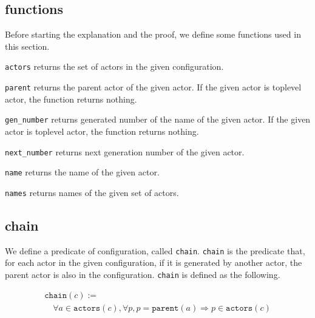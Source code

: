 \subsection{functions}

Before starting the explanation and the proof, we define some functions used in this section.

\begin{description}[style=nextline,leftmargin=12pt,parsep=0pt]
\item[\texttt{actors} $: \textit{Configuration} \rightarrow \textit{Set(Actor)}$]
  \texttt{actors} returns the set of actors in the given configuration.
\item[\texttt{parent} $: \textit{Actor} \rightarrow \textit{Actor}$]
  \texttt{parent} returns the parent actor of the given actor.
  If the given actor is toplevel actor, the function returns nothing. %
\item[\texttt{gen\_number} $: \textit{Actor} \rightarrow \mathbb{N}$]
  \texttt{gen\_number} returns generated number of the name of the given actor.
  If the given actor is toplevel actor, the function returns nothing.
\item[\texttt{next\_number} $: \textit{Actor} \rightarrow \mathbb{N}$]
  \texttt{next\_number} returns next generation number of the given actor.
\item[\texttt{name} $: \textit{Actor} \rightarrow \textit{Name}$]
  \texttt{name} returns the name of the given actor.
\item[\texttt{names} $: \textit{Set(Actor)} \rightarrow \textit{Set(Name)}$]
  \texttt{names} returns names of the given set of actors.
\end{description}

\subsection{chain}
We define a predicate of configuration, called \texttt{chain}.
\texttt{chain} is the predicate that, for each actor in the given configuration, if it is generated by another actor, the parent actor is also in the configuration.
\texttt{chain} is defined as the following.

\begin{displaymath}
  \begin{array}{l}
    \texttt{chain}(c) := \\
    \quad \forall a \in \texttt{actors}(c), \forall p, p = \texttt{parent}(a) \Rightarrow p \in \texttt{actors}(c)
  \end{array}
\end{displaymath}

